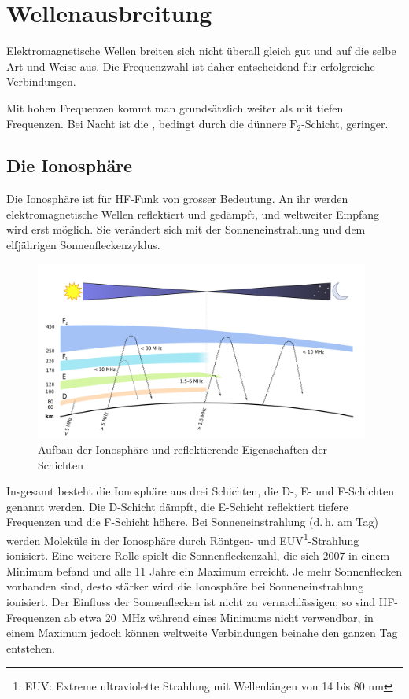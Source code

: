 
\chapter{Wellenausbreitung}
Elektromagnetische Wellen breiten sich nicht überall gleich gut und auf die selbe Art und Weise aus. Die Frequenzwahl ist daher entscheidend für erfolgreiche Verbindungen.

Mit hohen Frequenzen kommt man grundsätzlich weiter als mit tiefen Frequenzen. Bei Nacht ist die , bedingt durch die dünnere $\mathrm F_2$-Schicht, geringer.

\section{Die Ionosphäre}
Die Ionosphäre ist für HF-Funk von grosser Bedeutung. An ihr werden elektromagnetische Wellen reflektiert und gedämpft, und weltweiter Empfang wird erst möglich. Sie verändert sich mit der Sonneneinstrahlung und dem elfjährigen Sonnenfleckenzyklus.

\begin{figure}[h!]
 \centering
 \includegraphics[width=11cm]{./png/Amfu-Ionosphere.png}
 \caption{Aufbau der Ionosphäre und reflektierende Eigenschaften der Schichten}
 \label{fig:ionosphere}
\end{figure}


Insgesamt besteht die Ionosphäre aus drei Schichten, die D-, E- und F-Schichten genannt werden. Die D-Schicht dämpft, die E-Schicht reflektiert tiefere Frequenzen und die F-Schicht höhere. Bei Sonneneinstrahlung (d. h. am Tag) werden Moleküle in der Ionosphäre durch Röntgen- und EUV\footnote{EUV: Extreme ultraviolette Strahlung mit Wellenlängen von 14 bis 80 nm}-Strahlung ionisiert. Eine weitere Rolle spielt die Sonnenfleckenzahl, die sich 2007 in einem Minimum befand und alle 11 Jahre ein Maximum erreicht. Je mehr Sonnenflecken vorhanden sind, desto stärker wird die Ionosphäre bei Sonneneinstrahlung ionisiert. Der Einfluss der Sonnenflecken ist nicht zu vernachlässigen; so sind HF-Frequenzen ab etwa 20 MHz während eines Minimums nicht verwendbar, in einem Maximum jedoch können weltweite Verbindungen beinahe den ganzen Tag entstehen.

